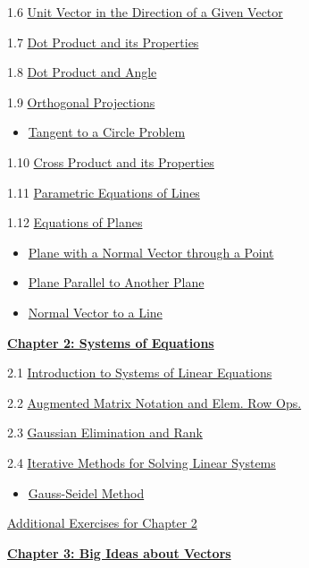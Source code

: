 \documentclass{ximera}
\begin{document}
1.6	\href{\xmbaseurl/VEC-0036/main}{Unit Vector in the Direction of a Given Vector}
	
1.7	\href{\xmbaseurl/VEC-0050/main}{Dot Product and its Properties}
	
1.8	\href{\xmbaseurl/VEC-0060/main}{Dot Product and Angle }
	
1.9	\href{\xmbaseurl/VEC-0070/main}{Orthogonal Projections}
\begin{itemize}
    \item 
    \href{https://www.geogebra.org/m/bngnjxee}{Tangent to a Circle Problem}
\end{itemize}
	
1.10	\href{\xmbaseurl/VEC-0080/main}{Cross Product and its Properties}
	
1.11	\href{\xmbaseurl/RRN-0020/main}{Parametric Equations of Lines}
	
1.12	\href{\xmbaseurl/RRN-0030/main}{Equations of Planes}
\begin{itemize}
\item
\href{https://www.geogebra.org/m/gsaag2dx}{Plane with a Normal Vector through a Point}
\item
\href{https://www.geogebra.org/m/unceva9g}{Plane Parallel to Another Plane}
\item
\href{https://www.geogebra.org/m/tg2duwqk}{Normal Vector to a Line}
\end{itemize}	
\href{\xmbaseurl/XLAChapter_systems/main}{\textbf{Chapter 2: Systems of Equations}}
	
2.1	\href{\xmbaseurl/SYS-0020/main}{Introduction to Systems of Linear Equations}
	
2.2	\href{\xmbaseurl/SYS-0030/main}{Augmented Matrix Notation and Elem. Row Ops.}
	
2.3	\href{\xmbaseurl/SYS-0030/main}{Gaussian Elimination and Rank}
	
2.4	\href{\xmbaseurl/SYS-0040/main}{Iterative Methods for Solving Linear Systems}
\begin{itemize}
    \item 
    \href{https://www.geogebra.org/m/hndq9nmq}{Gauss-Seidel Method}
\end{itemize}
	
\href{\xmbaseurl/SUPX-0020/main}{Additional Exercises for Chapter 2}
	
\href{\xmbaseurl/XLAChapter_bigIdeas/main}{\textbf{Chapter 3: Big Ideas about Vectors}}
	
\end{document}
